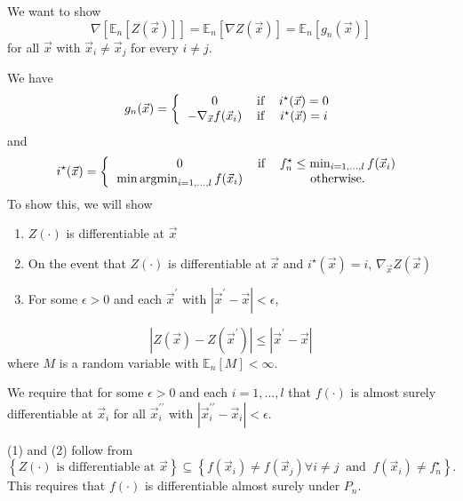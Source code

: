\documentclass[phd,tocprelim]{cornell}
\DeclareMathOperator*{\argmin}{argmin}
\begin{document}
We want to show
\begin{equation}
    \nabla \left[\mathbb{E}_{n}\left[Z \left(\vec{x}\right)\right]\right] = \mathbb{E}_{n}\left[\nabla Z \left(\vec{x}\right)\right] =  \mathbb{E}_{n}\left[g_{n}(\vec{x})\right]
\end{equation}
for all $\vec{x}$ with $\vec{x}_{i} \neq \vec{x}_{j}$ for every $i \neq j$.

We have
\begin{equation}
    g_{n}(\vec{x}) = \left\{ \begin{tabular}{ccc}
        0 & if & $i^{\star}(\vec{x}) = 0$ \\
        $-\nabla_{\vec{x}} f(\vec{x}_{i})$ & if & $i^{\star}(\vec{x}) = i$
    \end{tabular} \right.
\end{equation}
and
\begin{equation}
    i^{\star}(\vec{x}) = \left\{ \begin{tabular}{ccc}
        0 & if & $f_{n}^{\star} \leq \min_{i=1,\ldots,l} f(\vec{x}_{i})$ \\
        $\min \argmin_{i=1,\ldots,l} f(\vec{x}_{i})$ & & otherwise.
    \end{tabular} \right.
\end{equation}
To show this, we will show
\begin{enumerate}
    \item $Z(\cdot)$ is differentiable at $\vec{x}$
    \item On the event that $Z(\cdot)$ is differentiable at $\vec{x}$ and $i^{\star}(\vec{x}) = i$, $\nabla_{\vec{x}} Z(\vec{x})$
    \item For some $\epsilon > 0$ and each $\vec{x}^{\prime}$ with $|\vec{x}^{\prime} - \vec{x}| < \epsilon$,
\end{enumerate}
\begin{equation}
    \left|Z(\vec{x}) - Z(\vec{x}^{\prime})\right| \leq \left|\vec{x}^{\prime} - \vec{x}\right|
\end{equation}
where $M$ is a random variable with $\mathbb{E}_{n}\left[M\right] < \infty$.

We require that for some $\epsilon > 0$ and each $i = 1, \ldots, l$ that $f(\cdot)$ is almost surely differentiable at $\vec{x}_{i}$ for all $\vec{x}_{i}^{\prime\prime}$ with $|\vec{x}_{i}^{\prime\prime} - \vec{x}_{i}| < \epsilon$.

(1) and (2) follow from
\begin{equation}
    \left\{Z(\cdot) \text{ is differentiable at } \vec{x}\right\} \subseteq \left\{f(\vec{x}_{i}) \neq f(\vec{x}_{j}) \forall i \neq j \ \text{ and } \ f(\vec{x}_{i}) \neq f_{n}^{\star} \right\}.
\end{equation}
This requires that $f(\cdot)$ is differentiable almost surely under $P_{n}$.
\end{document}
